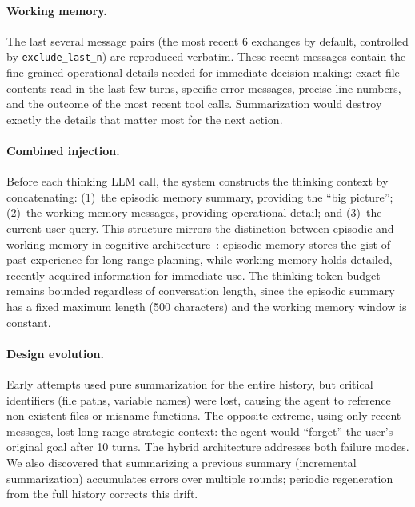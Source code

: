 \paragraph{Working memory.}
The last several message pairs (the most recent 6 exchanges by default, controlled by \texttt{exclude\_last\_n}) are reproduced verbatim. These recent messages contain the fine-grained operational details needed for immediate decision-making: exact file contents read in the last few turns, specific error messages, precise line numbers, and the outcome of the most recent tool calls. Summarization would destroy exactly the details that matter most for the next action.

\paragraph{Combined injection.} Before each thinking LLM call, the system constructs the thinking context by concatenating: (1)~the episodic memory summary, providing the ``big picture''; (2)~the working memory messages, providing operational detail; and (3)~the current user query. This structure mirrors the distinction between episodic and working memory in cognitive architecture~\cite{baddeley1992working}: episodic memory stores the gist of past experience for long-range planning, while working memory holds detailed, recently acquired information for immediate use. The thinking token budget remains bounded regardless of conversation length, since the episodic summary has a fixed maximum length (500 characters) and the working memory window is constant.

\paragraph{Design evolution.} Early attempts used pure summarization for the entire history, but critical identifiers (file paths, variable names) were lost, causing the agent to reference non-existent files or misname functions. The opposite extreme, using only recent messages, lost long-range strategic context: the agent would ``forget'' the user's original goal after 10 turns. The hybrid architecture addresses both failure modes. We also discovered that summarizing a previous summary (incremental summarization) accumulates errors over multiple rounds; periodic regeneration from the full history corrects this drift.
